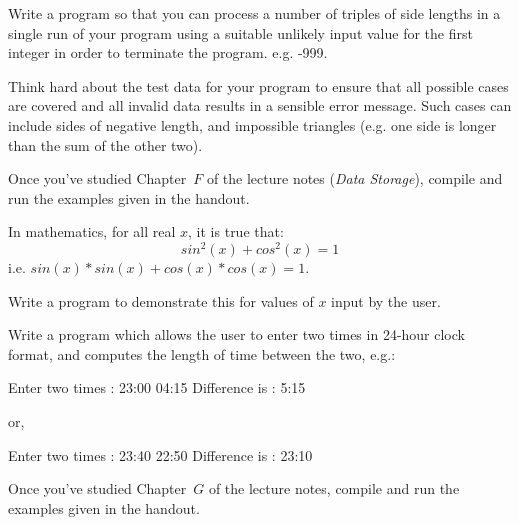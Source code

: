 \begin{exercise}
Write a program so that you can process a number of triples of side lengths
in a single run of your program using a suitable
unlikely input value for the first integer in order to terminate
the program. e.g. -999.

Think hard about the test data for your program to ensure that
all possible cases are covered and all invalid data results in
a sensible error message. Such cases can include sides of negative length,
and impossible triangles (e.g. one side is longer than the sum of the other two).
\end{exercise}




\begin{exercise}
Once you've studied Chapter~$F$ of the lecture notes ({\em Data Storage}), 
compile and run the examples given in the handout.
\end{exercise}

In mathematics, for all real $x$, it is true that:
\[
sin^2(x) + cos^2(x) = 1
\]
i.e. $sin(x)*sin(x) + cos(x)*cos(x) = 1$.\\

\begin{exercise}
Write a program to demonstrate this for values of $x$ input by the user.
\end{exercise}

\begin{exercise}
Write a program which allows the user to enter two times in
24-hour clock format, and computes the length of time between the
two, e.g.:
\begin{terminaloutput}
Enter two times : 23:00 04:15
Difference is : 5:15
\end{terminaloutput}
or,
\begin{terminaloutput}
Enter two times : 23:40 22:50
Difference is : 23:10
\end{terminaloutput}
\end{exercise}



\begin{exercise}
Once you've studied Chapter~$G$ of the lecture notes, 
compile and run the examples given in the handout.
\end{exercise}

